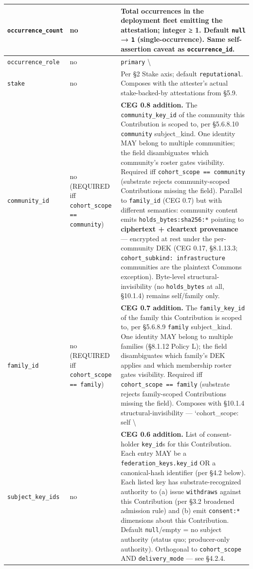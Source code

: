 \documentclass[11pt]{article}
\begin{document}
{\begin{longtable}{|p{5.33cm}|p{5.33cm}|p{5.33cm}|}
\texttt{occurrence\_count} & no & Total occurrences in the deployment fleet emitting the attestation; integer ≥ 1. Default \texttt{null} → \texttt{1} (single-occurrence). Same self-assertion caveat as \texttt{occurrence\_id}. \\ \hline
\texttt{occurrence\_role} & no & \texttt{primary} \textbackslash{} \\ \hline
\texttt{stake} & no & Per §2 Stake axis; default \texttt{reputational}. Composes with the attester's actual stake-backed-by attestations from §5.9. \\ \hline
\texttt{community\_id} & no (REQUIRED iff \texttt{cohort\_scope == community}) & \textbf{CEG 0.8 addition.} The \texttt{community\_key\_id} of the community this Contribution is scoped to, per §5.6.8.10 \texttt{community} subject\_kind. One identity MAY belong to multiple communities; the field disambiguates which community's roster gates visibility. Required iff \texttt{cohort\_scope == community} (substrate rejects community-scoped Contributions missing the field). Parallel to \texttt{family\_id} (CEG 0.7) but with different semantics: community content emits \texttt{holds\_bytes:sha256:*} pointing to \textbf{ciphertext + cleartext provenance} — encrypted at rest under the per-community DEK (CEG 0.17, §8.1.13.3; \texttt{cohort\_subkind: infrastructure} communities are the plaintext Commons exception). Byte-level structural-invisibility (no \texttt{holds\_bytes} at all, §10.1.4) remains self/family only. \\ \hline
\texttt{family\_id} & no (REQUIRED iff \texttt{cohort\_scope == family}) & \textbf{CEG 0.7 addition.} The \texttt{family\_key\_id} of the family this Contribution is scoped to, per §5.6.8.9 \texttt{family} subject\_kind. One identity MAY belong to multiple families (§8.1.12 Policy L); the field disambiguates which family's DEK applies and which membership roster gates visibility. Required iff \texttt{cohort\_scope == family} (substrate rejects family-scoped Contributions missing the field). Composes with §10.1.4 structural-invisibility — `cohort\_scope: self \textbackslash{} \\ \hline
\texttt{subject\_key\_ids} & no & \textbf{CEG 0.6 addition.} List of consent-holder \texttt{key\_id}s for this Contribution. Each entry MAY be a \texttt{federation\_keys.key\_id} OR a canonical-hash identifier (per §4.2 below). Each listed key has substrate-recognized authority to (a) issue \texttt{withdraws} against this Contribution (per §3.2 broadened admission rule) and (b) emit \texttt{consent:*} dimensions about this Contribution. Default \texttt{null}/empty = no subject authority (status quo; producer-only authority). Orthogonal to \texttt{cohort\_scope} AND \texttt{delivery\_mode} — see §4.2.4. \\ \hline

\end{longtable}}
\end{document}
